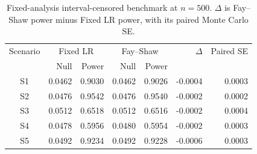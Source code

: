 \documentclass[12pt]{article}
\theoremstyle{definition}
\theoremstyle{remark}
\begin{document}
\begin{table}[H]
\centering
\small
\setlength{\tabcolsep}{4pt}
\renewcommand{\arraystretch}{1.10}
\caption{Fixed-analysis interval-censored benchmark at $n=500$. $\Delta$ is Fay--Shaw power minus Fixed LR power, with its paired Monte Carlo SE.}\label{tab:ic-benchmark}
\begin{tabular}{crrrrrr}
\toprule
Scenario & \multicolumn{2}{c}{Fixed LR} & \multicolumn{2}{c}{Fay--Shaw} & $\Delta$ & Paired SE \\
 & Null & Power & Null & Power & & \\
\midrule
S1 & 0.0462 & 0.9030 & 0.0462 & 0.9026 & -0.0004 & 0.0003 \\
S2 & 0.0476 & 0.9542 & 0.0476 & 0.9540 & -0.0002 & 0.0002 \\
S3 & 0.0512 & 0.6518 & 0.0512 & 0.6516 & -0.0002 & 0.0004 \\
S4 & 0.0478 & 0.5956 & 0.0480 & 0.5954 & -0.0002 & 0.0003 \\
S5 & 0.0492 & 0.9234 & 0.0492 & 0.9228 & -0.0006 & 0.0003 \\
\bottomrule
\end{tabular}
\end{table}
\end{document}
